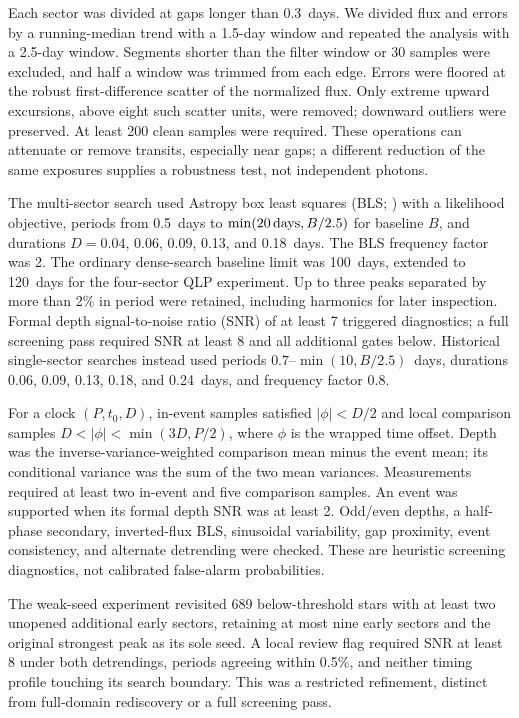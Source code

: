 Each sector was divided at gaps longer than 0.3~days. We divided flux and
errors by a running-median trend with a 1.5-day window and repeated the
analysis with a 2.5-day window. Segments shorter than the filter window
or 30 samples were excluded, and half a window was trimmed from each edge.
Errors were floored at the robust first-difference scatter of the normalized
flux. Only extreme upward excursions, above eight such scatter units, were
removed; downward outliers were preserved. At least 200 clean samples were
required. These operations can attenuate or remove transits, especially near
gaps; a different reduction of the same exposures supplies a robustness
test, not independent photons.

The multi-sector search used Astropy box least squares (BLS;
\cite{kovacs2002,astropy2022}) with a likelihood objective, periods from
0.5~days to $\min(20\,{\rm days},B/2.5)$ for baseline $B$, and durations
$D=0.04$, 0.06, 0.09, 0.13, and 0.18~days. The BLS frequency factor was 2.
The ordinary dense-search baseline limit was 100~days, extended to
120~days for the four-sector QLP experiment. Up to three peaks separated
by more than 2\% in period were retained, including harmonics for later
inspection. Formal depth signal-to-noise ratio (SNR) of at least 7 triggered
diagnostics; a full screening pass required SNR at least 8 and all additional
gates below. Historical single-sector searches instead used periods
$0.7$--$\min(10,B/2.5)$~days, durations
0.06, 0.09, 0.13, 0.18, and 0.24~days, and frequency factor 0.8.

For a clock $(P,t_0,D)$, in-event samples satisfied
$|\phi|<D/2$ and local comparison samples
$D<|\phi|<\min(3D,P/2)$, where $\phi$ is the wrapped time offset.
Depth was the inverse-variance-weighted comparison mean minus the event
mean; its conditional variance was the sum of the two mean variances.
Measurements required at least two in-event and five comparison samples.
An event was supported when its formal depth SNR was at least 2.
Odd/even depths, a half-phase secondary, inverted-flux BLS, sinusoidal
variability, gap proximity, event consistency, and alternate detrending were
checked. These are heuristic screening diagnostics, not calibrated
false-alarm probabilities.

The weak-seed experiment revisited 689 below-threshold stars with at least
two unopened additional early sectors, retaining at most nine early sectors
and the original strongest peak as its sole seed. A local review flag
required SNR at least 8 under both detrendings, periods agreeing within
0.5\%, and neither timing profile touching its search boundary.
This was a restricted refinement, distinct from full-domain rediscovery
or a full screening pass.

